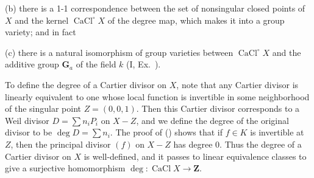 {(b) there is a 1-1 correspondence between the set of nonsingular closed points of $X$ and the kernel $\operatorname{CaCl}^{\circ}X$ of the degree map, which makes it into a group variety; and in fact

(c) there is a natural isomorphism of group varieties between $\operatorname{CaCl}^{\circ}X$ and the additive group $\mathbf G_a$ of the field $k$ (I, Ex.\ ).

To define the degree of a Cartier divisor on $X$, note that any Cartier divisor is linearly equivalent to one whose local function is invertible in some neighborhood of the singular point $Z=(0,0,1)$. Then this Cartier divisor corresponds to a Weil divisor $D=\sum n_iP_i$ on $X-Z$, and we define the degree of the original divisor to be $\deg D=\sum n_i$. The proof of () shows that if $f\in K$ is invertible at $Z$, then the principal divisor $(f)$ on $X-Z$ has degree $0$. Thus the degree of a Cartier divisor on $X$ is well-defined, and it passes to linear equivalence classes to give a surjective homomorphism $\deg\colon\operatorname{CaCl}X\to\mathbf Z$.
}
